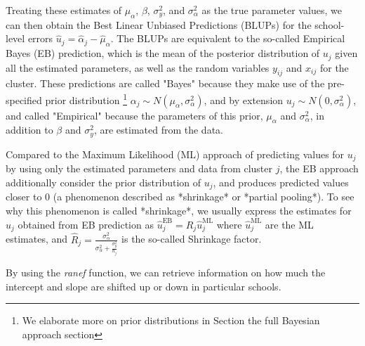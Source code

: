 Treating these estimates of $\mu_\alpha$, $\beta$, $\sigma^2_{y}$, and $\sigma^2_{\alpha}$ as the true parameter values, we can then obtain the Best Linear Unbiased Predictions (BLUPs) for the school-level errors $\hat{u}_j = \hat{\alpha}_{j} - \hat{\mu}_{\alpha}$. The BLUPs are equivalent to the so-called Empirical Bayes (EB) prediction, which is the mean of the posterior distribution of $u_{j}$ given all the estimated parameters, as well as the random variables $y_{ij}$ and $x_{ij}$ for the cluster.  These predictions are called "Bayes" because they make use of the pre-specified prior distribution \footnote{We elaborate more on prior distributions in Section the full Bayesian approach section} $\alpha_j \sim N(\mu_\alpha, \sigma^2_\alpha)$, and by extension $u_j \sim N(0, \sigma^2_\alpha)$, and called "Empirical" because the parameters of this prior, $\mu_\alpha$ and $\sigma^2_{\alpha}$, in addition to $\beta$ and $\sigma^2_{y}$, are estimated from the data.

Compared to the Maximum Likelihood (ML) approach of predicting values for $u_j$ by using only the estimated parameters and data from cluster $j$, the EB approach additionally consider the prior distribution of $u_{j}$, and produces predicted values closer to $0$ (a phenomenon described as *shrinkage* or *partial pooling*).  To see why this phenomenon is called *shrinkage*, we usually express the estimates for $u_j$ obtained from EB prediction as $\hat{u}_j^{\text{EB}} = \hat{R}_j\hat{u}_j^{\text{ML}}$ where $\hat{u}_j^{\text{ML}}$ are the ML estimates, and $\hat{R}_j = \frac{\sigma_\alpha^2}{\sigma_\alpha^2 + \frac{\sigma_y^2}{n_j}}$ is the so-called Shrinkage factor.

By using the \textit{ranef} function, we can retrieve information on how much the intercept and slope are shifted up or down in particular schools.

